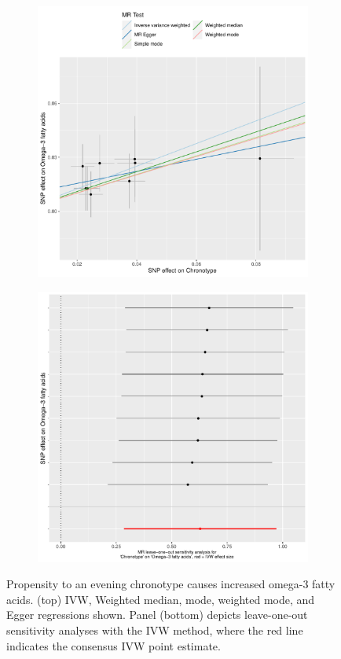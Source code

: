 \documentclass{article}
\begin{document}
\begin{figure}[htbp]
\begin{subfigure}{\linewidth}
\centering
	\includegraphics[width=.8\linewidth]{Figs/Analysis2/Chronotype_vs_Omega-3_fatty_acids.Scatterplots.pdf}
\label{omega3Scatter}
\end{subfigure}
\begin{subfigure}{\linewidth}
\centering
	\includegraphics[width=.8\linewidth,keepaspectratio]{Figs/Analysis2/Chronotype_vs_Omega-3_fatty_acids.LOOplots.pdf}
\label{omega3Loo}
\end{subfigure}
\caption{Propensity to an evening chronotype causes increased omega-3 fatty acids. (top) IVW, Weighted median, mode, weighted mode, and Egger regressions shown. Panel (bottom) depicts leave-one-out sensitivity analyses with the IVW method, where the red line indicates the consensus IVW point estimate.}
\label{omega3}
\end{figure}
\end{document}
